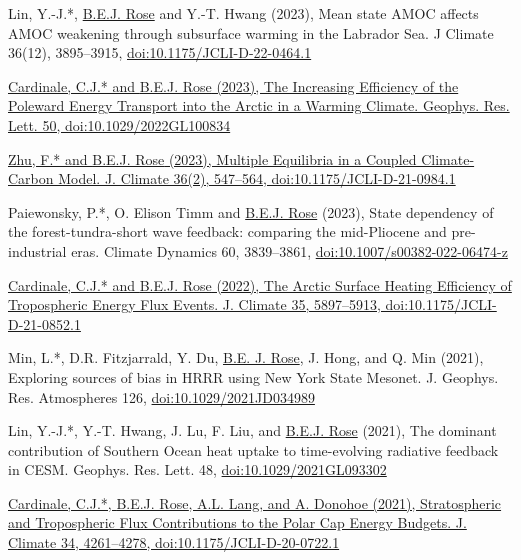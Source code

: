 \documentclass[11pt, letterpaper]{article} %
\newcommand{\years}[1]{\marginnote{\scriptsize #1}} %
\newcommand{\publink}{http://www.atmos.albany.edu/facstaff/brose/resources/Publications/}
\begin{document}
\years{2023}

Lin, Y.-J.*, \underline{B.E.J. Rose} and Y.-T. Hwang (2023), Mean state AMOC affects AMOC weakening through subsurface warming in the Labrador Sea. J Climate 36(12), 3895--3915, \href{https://doi.org/10.1175/JCLI-D-22-0464.1}{doi:10.1175/JCLI-D-22-0464.1}
\vspace{0.2 cm}

\href{\publink Cardinale_Rose_GRL2023.pdf}{Cardinale, C.J.* and \underline{B.E.J. Rose} (2023), The Increasing Efficiency of the Poleward Energy Transport into the Arctic in a Warming Climate. Geophys. Res. Lett. 50, doi:10.1029/2022GL100834}
\vspace{0.2 cm} 

\href{\publink Zhu_Rose_JClim2023.pdf}{Zhu, F.* and \underline{B.E.J. Rose} (2023), Multiple Equilibria in a Coupled Climate-Carbon Model. J. Climate 36(2), 547--564, doi:10.1175/JCLI-D-21-0984.1}
\vspace{0.2 cm} 

Paiewonsky, P.*, O. Elison Timm and \underline{B.E.J. Rose} (2023), State dependency of the forest-tundra-short wave feedback: comparing the mid-Pliocene and pre-industrial eras. Climate Dynamics 60, 3839--3861, \href{https://doi.org/10.1007/s00382-022-06474-z}{doi:10.1007/s00382-022-06474-z}
\vspace{0.2 cm}

\years{2022}

\href{\publink Cardinale_Rose_JClim2022.pdf}{Cardinale, C.J.* and \underline{B.E.J. Rose} (2022), The Arctic Surface Heating Efficiency of Tropospheric Energy Flux Events. J. Climate 35, 5897--5913, doi:10.1175/JCLI-D-21-0852.1}
\vspace{0.2 cm} 

\years{2021}
Min, L.*, D.R. Fitzjarrald, Y. Du, \underline{B.E. J. Rose}, J. Hong, and Q. Min (2021), Exploring sources of bias in HRRR using New York State Mesonet. J. Geophys. Res. Atmospheres 126, \href{https://doi.org/10.1029/2021JD034989}{doi:10.1029/2021JD034989}
\vspace{0.2 cm}

Lin, Y.-J.*, Y.-T. Hwang, J. Lu, F. Liu, and \underline{B.E.J. Rose} (2021), The dominant contribution of Southern Ocean heat uptake to time-evolving radiative feedback in CESM. Geophys. Res. Lett. 48, \href{https://doi.org/10.1029/2021GL093302}{doi:10.1029/2021GL093302}
\vspace{0.2 cm}

\href{\publink Cardinale_etal_JClim2021.pdf}{Cardinale, C.J.*, \underline{B.E.J. Rose}, A.L. Lang, and A. Donohoe (2021), Stratospheric and Tropospheric Flux Contributions to the Polar Cap Energy Budgets. J. Climate 34, 4261--4278, doi:10.1175/JCLI-D-20-0722.1}
\vspace{0.2 cm}
\end{document}

